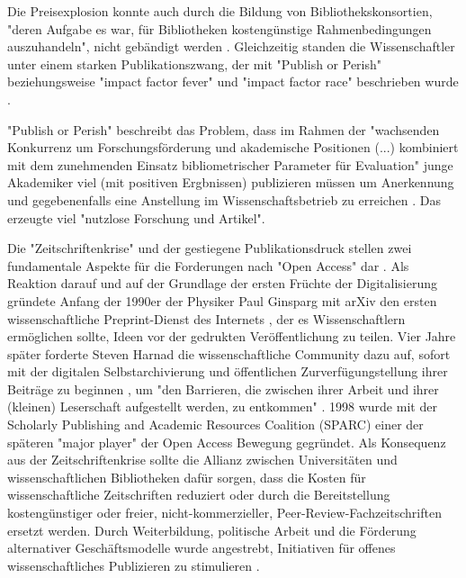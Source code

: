 Die Preisexplosion konnte auch durch die Bildung von Bibliothekskonsortien, "deren Aufgabe es war, für Bibliotheken kostengünstige Rahmenbedingungen auszuhandeln", nicht gebändigt werden \cite{Fladung_2003} \cite{Brintzinger_2010}. Gleichzeitig standen die Wissenschaftler unter einem starken Publikationszwang, der mit "Publish or Perish" \cite{CLAPHAM_2005} beziehungsweise "impact factor fever" \cite{Cherubini_2008} und "impact factor race" \cite{Brischoux_2009} beschrieben wurde \cite{offhaus_2012_institutionelle_repos}.

"Publish or Perish" beschreibt das Problem, dass im Rahmen der "wachsenden Konkurrenz um Forschungsförderung und akademische Positionen (...) kombiniert mit dem zunehmenden Einsatz bibliometrischer Parameter für Evaluation" \cite{Fanelli_2010} junge Akademiker viel (mit positiven Ergbnissen) publizieren müssen um Anerkennung und gegebenenfalls eine Anstellung im Wissenschaftsbetrieb zu erreichen \cite{pscheida_2010_wikipedia} \cite{Beasley_2005}. Das erzeugte viel "nutzlose Forschung und Artikel"\cite{smith1990killing}.

Die "Zeitschriftenkrise" und der gestiegene Publikationsdruck stellen zwei fundamentale Aspekte für die Forderungen nach "Open Access" dar \cite{Brintzinger_2010}. Als Reaktion darauf und auf der Grundlage der ersten Früchte der Digitalisierung gründete Anfang der 1990er der Physiker Paul Ginsparg mit arXiv den ersten wissenschaftliche Preprint-Dienst des Internets \cite{suchen}, der es Wissenschaftlern ermöglichen sollte, Ideen vor der gedrukten Veröffentlichung zu teilen. Vier Jahre später forderte Steven Harnad die wissenschaftliche Community dazu auf, sofort mit der digitalen Selbstarchivierung und öffentlichen Zurverfügungstellung ihrer Beiträge zu beginnen \cite{albert_2006_open_implications}, um "den Barrieren, die zwischen ihrer Arbeit und ihrer (kleinen) Leserschaft aufgestellt werden, zu entkommen" \cite{harnad_1995_subversive_proposal}. 1998 wurde mit der Scholarly Publishing and Academic Resources Coalition (SPARC) einer der späteren "major player" der Open Access Bewegung \cite{russell2008business} \cite{Herb_2012} gegründet. Als Konsequenz aus der Zeitschriftenkrise sollte die Allianz zwischen Universitäten und wissenschaftlichen Bibliotheken dafür sorgen, dass die Kosten für wissenschaftliche Zeitschriften reduziert oder durch die Bereitstellung kostengünstiger oder freier, nicht-kommerzieller, Peer-Review-Fachzeitschriften ersetzt werden. Durch Weiterbildung, politische Arbeit und die Förderung alternativer Geschäftsmodelle wurde angestrebt, Initiativen für offenes wissenschaftliches Publizieren zu stimulieren \cite{suchen}.

